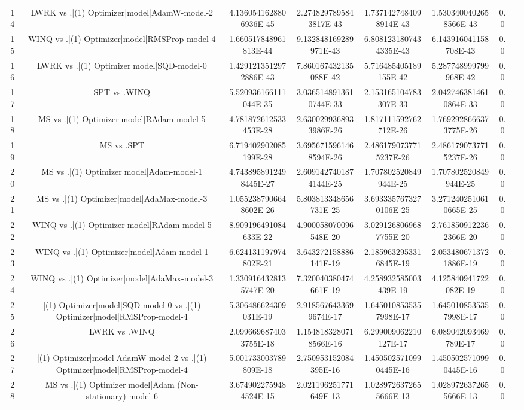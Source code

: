 \documentclass[a3paper,10pt]{article}
\begin{document}
\begin{table}[!htp]
\begin{tabular}{cccccccc}
14&LWRK vs .|(1) Optimizer|model|AdamW-model-2&4.1360541628806936E-45&2.2748297895843817E-43&1.7371427484098914E-43&1.5303400402658566E-43&0.0\\
15&WINQ vs .|(1) Optimizer|model|RMSProp-model-4&1.660517848961813E-44&9.132848169289971E-43&6.8081231807434335E-43&6.143916041158708E-43&0.0\\
16&LWRK vs .|(1) Optimizer|model|SQD-model-0&1.4291213512972886E-43&7.860167432135088E-42&5.716485405189155E-42&5.287748999799968E-42&0.0\\
17&SPT vs .WINQ&5.520936166111044E-35&3.0365148913610744E-33&2.153165104783307E-33&2.0427463814610864E-33&0.0\\
18&MS vs .|(1) Optimizer|model|RAdam-model-5&4.781872612533453E-28&2.6300299368933986E-26&1.817111592762712E-26&1.7692928666373775E-26&0.0\\
19&MS vs .SPT&6.719402902085199E-28&3.6956715961468594E-26&2.4861790737715237E-26&2.4861790737715237E-26&0.0\\
20&MS vs .|(1) Optimizer|model|Adam-model-1&4.7438958912498445E-27&2.6091427401874144E-25&1.707802520849944E-25&1.707802520849944E-25&0.0\\
21&MS vs .|(1) Optimizer|model|AdaMax-model-3&1.0552387906648602E-26&5.803813348656731E-25&3.6933357673270106E-25&3.2712402510610665E-25&0.0\\
22&WINQ vs .|(1) Optimizer|model|RAdam-model-5&8.909196491084633E-22&4.900058070096548E-20&3.0291268069687755E-20&2.7618509122362366E-20&0.0\\
23&WINQ vs .|(1) Optimizer|model|Adam-model-1&6.624131197974802E-21&3.643272158886141E-19&2.1859632953316845E-19&2.0534806713721886E-19&0.0\\
24&WINQ vs .|(1) Optimizer|model|AdaMax-model-3&1.3309164328135747E-20&7.320040380474661E-19&4.258932585003439E-19&4.125840941722082E-19&0.0\\
25&|(1) Optimizer|model|SQD-model-0 vs .|(1) Optimizer|model|RMSProp-model-4&5.306486624309031E-19&2.9185676433699674E-17&1.6450108535357998E-17&1.6450108535357998E-17&0.0\\
26&LWRK vs .WINQ&2.0996696874033755E-18&1.1548183280718566E-16&6.299009062210127E-17&6.089042093469789E-17&0.0\\
27&|(1) Optimizer|model|AdamW-model-2 vs .|(1) Optimizer|model|RMSProp-model-4&5.001733003789809E-18&2.750953152084395E-16&1.4505025710990445E-16&1.4505025710990445E-16&0.0\\
28&MS vs .|(1) Optimizer|model|Adam (Non-stationary)-model-6&3.6749022759484524E-15&2.021196251771649E-13&1.0289726372655666E-13&1.0289726372655666E-13&0.0\\

\end{tabular}
\end{table}
\end{document}
